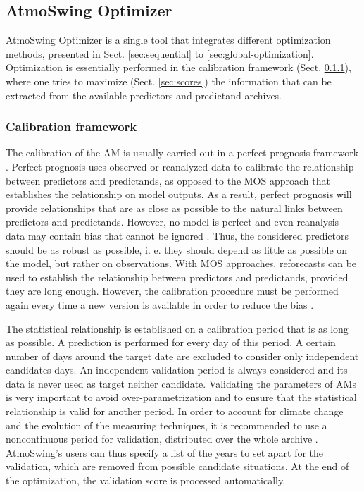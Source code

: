 \documentclass[review]{elsarticle}
\begin{document}
\subsection{AtmoSwing Optimizer}
\label{sec:optimizer}

AtmoSwing Optimizer is a single tool that integrates different optimization methods, presented in Sect. \ref{sec:sequential} to \ref{sec:global-optimization}. Optimization is essentially performed in the calibration framework (Sect. \ref{sec:calibration-framework}), where one tries to maximize (Sect. \ref{sec:scores}) the information that can be extracted from the available predictors and predictand archives.


\subsubsection{Calibration framework}
\label{sec:calibration-framework}

The calibration of the AM is usually carried out in a perfect prognosis \citep{Klein1959} framework \citep{Bontron2004, BenDaoud2010}. Perfect prognosis uses observed or reanalyzed data to calibrate the relationship between predictors and predictands, as opposed to the MOS approach that establishes the relationship on model outputs. As a result, perfect prognosis will provide relationships that are as close as possible to the natural links between predictors and predictands. However, no model is perfect and even reanalysis data may contain bias that cannot be ignored \citep{Dayon2015, Horton2018b}. Thus, the considered predictors should be as robust as possible, i. e. they should depend as little as possible on the model, but rather on observations. With MOS approaches, reforecasts can be used to establish the relationship between predictors and predictands, provided they are long enough. However, the calibration procedure must be performed again every time a new version is available in order to reduce the bias \citep{Wilson2002}.

The statistical relationship is established on a calibration period that is as long as possible. A prediction is performed for every day of this period. A certain number of days around the target date are excluded to consider only independent candidates days. An independent validation period is always considered and its data is never used as target neither candidate. Validating the parameters of AMs is very important to avoid over-parametrization and to ensure that the statistical relationship is valid for another period. In order to account for climate change and the evolution of the measuring techniques, it is recommended to use a noncontinuous period for validation, distributed over the whole archive \citep{BenDaoud2010, Horton2018b}. AtmoSwing's users can thus specify a list of the years to set apart for the validation, which are removed from possible candidate situations. At the end of the optimization, the validation score is processed automatically.
\end{document}
